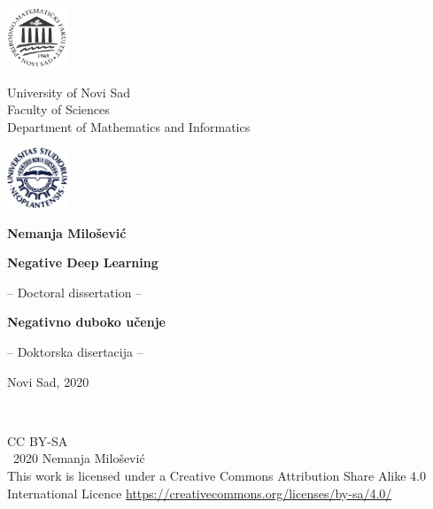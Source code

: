\documentclass[b5paper]{book}
\author{\autor}
\title{\naslov}
\date{Novi Sad, 2020}
\newcommand{\naslov}{Negative Deep Learning}
\newcommand{\naslovsr}{Negativno duboko učenje}
\begin{document}
\frontmatter

\newcommand{\makemytitle}{
  \begin{center}

	\includegraphics[width=1.8cm]{pmf-logo}\hspace{\stretch{1}}
	\parbox[b]{45ex}{\centering
          University of Novi Sad\\
Faculty of Sciences\\
Department of Mathematics and Informatics\\ }\hspace{\stretch{1}}
	\includegraphics[width=1.8cm]{uns-logo}

	\vspace{15ex}

	\parbox[b]{\textwidth}{{\Large {\bf \hspace{0.5cm}Nemanja Milošević}}}
	\vspace{4ex}

	{\huge
            \setlength{\baselineskip}{1.5\baselineskip}\textbf{\naslov}\par}

	\vspace{4ex}
	-- Doctoral dissertation  --

        \vspace{5ex}

	{\huge
            \setlength{\baselineskip}{1.5\baselineskip}\textbf{\naslovsr}\par}

	\vspace{4ex}
	-- Doktorska disertacija  --

	\vfill

	Novi Sad, 2020
	\end{center}
	\thispagestyle{empty}
	\newpage
}

\makemytitle

~

\vfill

\thispagestyle{empty}
\noindent CC BY-SA \ccbysa\\
\textcopyright \ 2020 Nemanja Milošević\\
This work is licensed under a
Creative Commons Attribution Share Alike 4.0 International Licence
\url{https://creativecommons.org/licenses/by-sa/4.0/}
\end{document}

